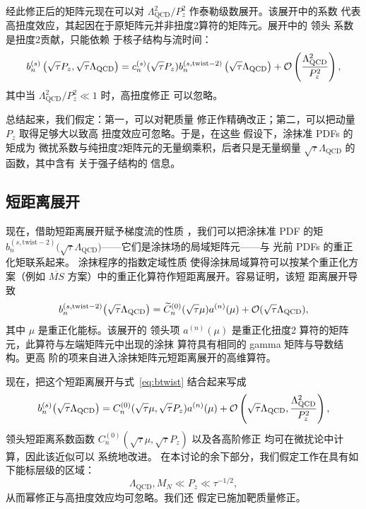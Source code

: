 经此修正后的矩阵元现在可以对
$\Lambda_\mathrm{QCD}^2/P_z^2$ 作泰勒级数展开。该展开中的系数
代表高扭度效应，其起因在于原矩阵元并非扭度2算符的矩阵元。展开中的
领头
系数是扭度2贡献，只能依赖
于核子结构与流时间：
\begin{equation}\label{eq:btwist}
b_n^{(s)} \left(\sqrt{\tau}P_z,\sqrt{\tau}\Lambda_{\mathrm{QCD}}\right)
=
c^{(s)}_n(\sqrt{\tau}P_z)b_n^{(s,\mathrm{twist}-2)}
\left(\sqrt{\tau}\Lambda_{\mathrm{QCD}}\right)  +{\cal
O}\left(\frac{\Lambda_\mathrm{QCD}^2}{P_z^2}\right),
\end{equation}
其中当 $\Lambda_\mathrm{QCD}^2/P_z^2\ll 1$ 时，高扭度修正
可以忽略。

总结起来，我们假定：第一，可以对靶质量
修正作精确改正；第二，可以把动量 $P_z$ 取得足够大以致高
扭度效应可忽略。于是，在这些
假设下，涂抹准 PDFs 的矩成为
微扰系数与纯扭度2矩阵元的无量纲乘积，后者只是无量纲量
$\sqrt{\tau} \Lambda_{\mathrm{QCD}}$ 的函数，其中含有
关于强子结构的
信息。

\subsection{\label{sec:renormpdf} 短距离展开}

现在，借助短距离展开赋予梯度流的性质
\cite{Luscher:2011bx,Suzuki:2013gza,Asakawa:2013laa,Makino:2014taa,
Hieda:2016lly}，我们可以把涂抹准 PDF 的矩
$b_n^{(s,\mathrm{twist}-2)}\big(\sqrt{\tau}\Lambda_{\mathrm{QCD}}\big)$——它们是涂抹场的局域矩阵元——与
光前 PDFs 的重正化矩联系起来。
涂抹程序的指数定域性质
使得涂抹局域算符可以按某个重正化方案（例如
$\overline{MS}$ 方案）中的重正化算符作短距离展开。容易证明，该短
距离展开导致
\begin{equation}\label{eq:shortdist}
b_n^{(s,\mathrm{twist}-2)}\big(\sqrt{\tau}\Lambda_{\mathrm{QCD}}\big) =
\widetilde{C}_n^{(0)}(\sqrt{\tau}\mu)a^{(n)}(\mu) + {\cal
O}(\sqrt{\tau}\Lambda_{\mathrm{QCD}}),
\end{equation}
其中 $\mu$ 是重正化能标。该展开的
领头项 $a^{(n)}(\mu)$ 是重正化扭度2
算符的矩阵元，此算符与左端矩阵元中出现的涂抹
算符具有相同的 gamma 矩阵与导数结构。更高
阶的项来自进入涂抹矩阵元短距离展开的高维算符。

现在，把这个短距离展开与式~\eqref{eq:btwist} 结合起来写成
\begin{equation}\label{eq:double}
b_n^{(s)}\big(\sqrt{\tau}\Lambda_{\mathrm{QCD}}\big) =
C_n^{(0)}(\sqrt{\tau}\mu, \sqrt{\tau}P_z)a^{(n)}(\mu) + {\cal
O}\left(\sqrt{\tau}\Lambda_{\mathrm{QCD}},\frac{\Lambda_\mathrm{QCD}^2}{P_z^2}
\right),
\end{equation}
领头短距离系数函数
$ C_n^{(0)}(\sqrt{\tau}\mu, \sqrt{\tau}P_z)$ 以及各高阶修正
均可在微扰论中计算，因此该近似可以
系统地改进。
在本讨论的余下部分，我们假定工作在具有如下能标层级的区域：
\begin{equation}\label{eq:scales}
\Lambda_{\mathrm{QCD}},M_N\ll P_z\ll  \tau^{-1/2},
\end{equation}
从而幂修正与高扭度效应均可忽略。我们还
假定已施加靶质量修正。

